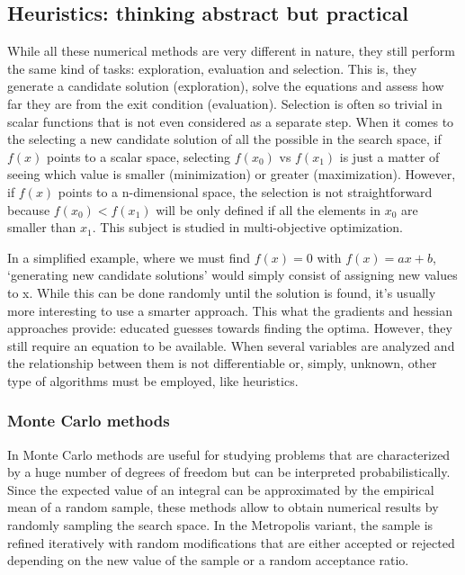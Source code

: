 \subsection{Heuristics: thinking abstract but practical}
While all these numerical methods are very different in nature, they still perform the same kind of tasks: exploration, evaluation and selection. This is, they generate a candidate solution (exploration), solve the equations and assess how far they are from the exit condition (evaluation). Selection is often so trivial in scalar functions that is not even considered as a separate step. When it comes to the selecting a new candidate solution of all the possible in the search space, if $f(x)$ points to a scalar space, selecting $f(x_{0})$ vs $f(x_{1})$ is just a matter of seeing which value is smaller (minimization) or greater (maximization). However, if $f(x)$ points to a n-dimensional space, the selection is not straightforward because $f(x_{0}) < f(x_{1})$ will be only defined if all the elements in $x_{0}$ are smaller than $x_{1}$. This subject is studied in multi-objective optimization.

In a simplified example, where we must find $f(x) = 0$ with $f(x) = ax + b$, ‘generating new candidate solutions’ would simply consist of assigning new values to x. While this can be done randomly until the solution is found, it’s usually more interesting to use a smarter approach. This what the gradients and hessian approaches provide: educated guesses towards finding the optima. However, they still require an equation to be available. When several variables are analyzed and the relationship between them is not differentiable or, simply, unknown, other type of algorithms must be employed, like heuristics.

\subsubsection{Monte Carlo methods}
In Monte Carlo methods are useful for studying problems that are characterized by a huge number of degrees of freedom but can be interpreted probabilistically. Since the expected value of an integral can be approximated by the empirical mean of a random sample, these methods allow to obtain numerical results by randomly sampling the search space. In the Metropolis variant, the sample is refined iteratively with random modifications that are either accepted or rejected depending on the new value of the sample or a random acceptance ratio.

